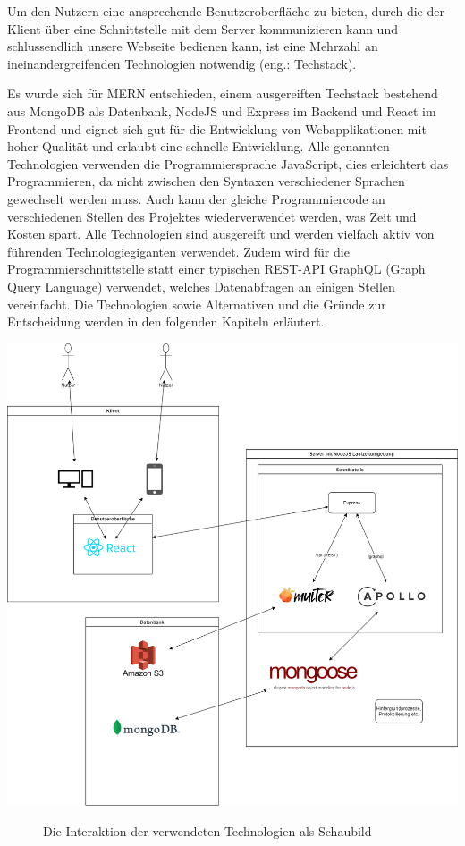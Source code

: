 Um den Nutzern eine ansprechende Benutzeroberfläche zu bieten, durch die der Klient über eine Schnittstelle mit dem Server kommunizieren kann und schlussendlich unsere Webseite bedienen kann, ist eine Mehrzahl an ineinandergreifenden Technologien notwendig (eng.: Techstack).

Es wurde sich für MERN entschieden, einem ausgereiften Techstack bestehend aus MongoDB als Datenbank, NodeJS und Express im Backend und React im Frontend und eignet sich gut für die Entwicklung von Webapplikationen mit hoher Qualität und erlaubt eine schnelle Entwicklung. \cite{TI1}
Alle genannten Technologien verwenden die Programmiersprache JavaScript, dies erleichtert das Programmieren, da nicht zwischen den Syntaxen verschiedener Sprachen gewechselt werden muss. Auch kann der gleiche Programmiercode an verschiedenen Stellen des Projektes wiederverwendet werden, was Zeit und Kosten spart. Alle Technologien sind ausgereift und werden vielfach aktiv von führenden Technologiegiganten verwendet. Zudem wird für die Programmierschnittstelle statt einer typischen REST-API GraphQL (Graph Query Language) verwendet, welches Datenabfragen an einigen Stellen vereinfacht. Die Technologien sowie Alternativen und die Gründe zur Entscheidung werden in den folgenden Kapiteln erläutert.

\includegraphics[width=\textwidth]{sources/MERN-Stack_Schaubild.drawio}
\begin{figure}[ht]
	\centering
	\caption{Die Interaktion der verwendeten Technologien als Schaubild}
	\label{figMERN1}
\end{figure}

